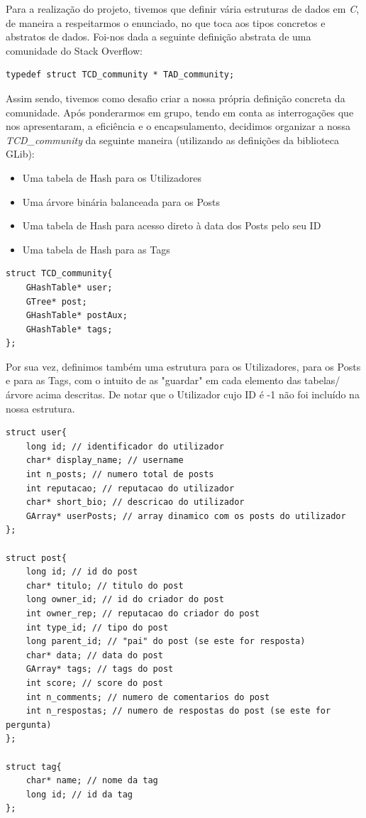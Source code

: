 \documentclass[a4paper, 11pt, oneside]{article}
\begin{document}
Para a realização do projeto, tivemos que definir vária estruturas de dados em \textit{C}, de maneira a respeitarmos o enunciado, no que toca aos tipos concretos e abstratos de dados. Foi-nos dada a seguinte definição abstrata de uma comunidade do Stack Overflow:

\begin{lstlisting}[caption=Definição da TAD\_community]
typedef struct TCD_community * TAD_community;
\end{lstlisting}

Assim sendo, tivemos como desafio criar a nossa própria definição concreta da comunidade. Após ponderarmos em grupo, tendo em conta as interrogações que nos apresentaram, a eficiência e o encapsulamento, decidimos organizar a nossa \textit{TCD\_community} da seguinte maneira (utilizando as definições da biblioteca GLib):
\begin{itemize}
\item Uma tabela de Hash para os Utilizadores
\item Uma árvore binária balanceada para os Posts
\item Uma tabela de Hash para acesso direto à data dos Posts pelo seu ID
\item Uma tabela de Hash para as Tags
\end{itemize}
\begin{lstlisting}[caption=Definição da TCD\_community]
struct TCD_community{
	GHashTable* user;
	GTree* post;
	GHashTable* postAux;
	GHashTable* tags;	
};
\end{lstlisting}

Por sua vez, definimos também uma estrutura para os Utilizadores, para os Posts e para as Tags, com o intuito de as "guardar" em cada elemento das tabelas/árvore acima descritas. De notar que o Utilizador cujo ID é -1 não foi incluído na nossa estrutura.

\begin{lstlisting}[caption=Definição de estruturas internas]
struct user{
	long id; // identificador do utilizador
	char* display_name; // username
	int n_posts; // numero total de posts
	int reputacao; // reputacao do utilizador
	char* short_bio; // descricao do utilizador 
	GArray* userPosts; // array dinamico com os posts do utilizador
};

struct post{
	long id; // id do post
	char* titulo; // titulo do post
	long owner_id; // id do criador do post
	int owner_rep; // reputacao do criador do post
	int type_id; // tipo do post
	long parent_id; // "pai" do post (se este for resposta)
	char* data; // data do post
	GArray* tags; // tags do post
	int score; // score do post
	int n_comments; // numero de comentarios do post
	int n_respostas; // numero de respostas do post (se este for pergunta)
};

struct tag{
	char* name; // nome da tag
	long id; // id da tag
};
\end{lstlisting}
\end{document}
